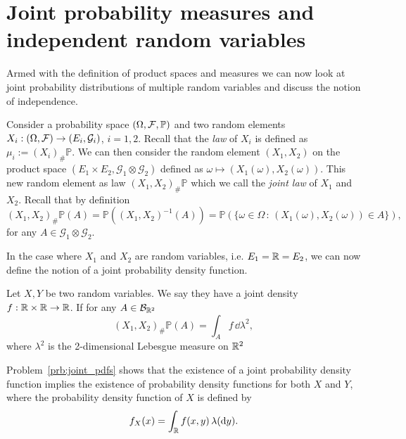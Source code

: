 %
%

\section{Joint probability measures and independent random variables}\label{sec:joint_prob_measures}

Armed with the definition of product spaces and measures we can now look at joint probability distributions of multiple random variables and discuss the notion of independence.

Consider a probability space $(\Omega, \mathcal F, \mathbb{P})$ and two random elements $X_i: (\Omega, \mathcal F) \to (E_i, \mathcal{G}_i)$, $i=1,2$. Recall that the \emph{law} of $X_i$ is defined as $\mu_i:= (X_i)_\# \mathbb{P}$. We can then consider the random element $(X_1, X_2)$ on the product space $(E_1 \times E_2, \mathcal{G}_1 \otimes \mathcal{G}_2)$ defined as $\omega \mapsto (X_1(\omega), X_2(\omega))$. This new random element as law $(X_1, X_2)_\# \mathbb{P}$ which we call the \emph{joint law} of $X_1$ and $X_2$. Recall that by definition
\[
	(X_1, X_2)_\# \mathbb{P}(A) = \mathbb{P}((X_1,X_2)^{-1}(A)) = \mathbb{P}(\{\omega \in \Omega \,:\, (X_1(\omega), X_2(\omega)) \in A\}),
\]
for any $A \in \mathcal{G}_1 \otimes \mathcal{G}_2$.





In the case where $X_1$ and $X_2$ are random variables, i.e. $E_1 = \mathbb R = E_2$, we can now define the notion of a joint probability density function.

\begin{definition}\label{def:joint_pdf}
Let $X,Y$ be two random variables. We say they have a joint density $f : \mathbb R \times \mathbb R \to \mathbb R$. If for any $A \in \mathcal B_{\mathbb R^2}$
\[
	(X_1, X_2)_\# \mathbb{P}(A) = \int_A f \, \dd \lambda^2,
\]
where $\lambda^2$ is the 2-dimensional Lebesgue measure on $\mathbb R^2$
\end{definition}

Problem~\ref{prb:joint_pdfs} shows that the existence of a joint probability density function implies the existence of probability density functions for both $X$ and $Y$, where the probability density function of $X$ is defined by
\[
	f_X(x) = \int_{\mathbb R} f(x,y) \, \lambda(\mathrm{d} y).
\] 

